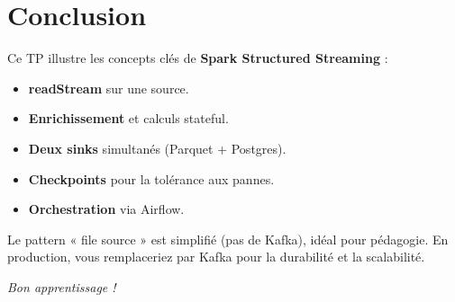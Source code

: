 \documentclass[12pt, a4paper]{article}
\begin{document}
\section{Conclusion}

Ce TP illustre les concepts clés de \textbf{Spark Structured Streaming} :

\begin{itemize}
  \item \textbf{readStream} sur une source.
  \item \textbf{Enrichissement} et calculs stateful.
  \item \textbf{Deux sinks} simultanés (Parquet + Postgres).
  \item \textbf{Checkpoints} pour la tolérance aux pannes.
  \item \textbf{Orchestration} via Airflow.
\end{itemize}

Le pattern « file source » est simplifié (pas de Kafka), idéal pour pédagogie. En production, vous remplaceriez par Kafka pour la durabilité et la scalabilité.

\vspace{1cm}

\textit{Bon apprentissage !}
\end{document}
